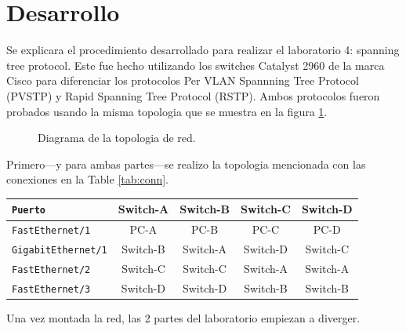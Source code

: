 \section{Desarrollo}

Se explicara el procedimiento desarrollado para realizar el laboratorio 4: spanning
tree protocol. Este fue hecho utilizando los switches Catalyst 2960 de la marca Cisco
para diferenciar los protocolos Per VLAN Spannning Tree Protocol (PVSTP) y Rapid
Spanning Tree Protocol (RSTP). Ambos protocolos fueron probados usando la misma
topologia que se muestra en la figura \ref{fig:topology}.

\begin{figure}
  \center
  
  \caption{Diagrama de la topologia de red.}
  \label{fig:topology}
\end{figure}

Primero---y para ambas partes---se realizo la topologia mencionada con las
conexiones en la Table \ref{tab:conn}.

\begin{center}
  \begin{tabular}{ l c c c c }
    \hline
    \texttt{Puerto}            & Switch-A & Switch-B  & Switch-C  & Switch-D \\
    \hline
    \texttt{FastEthernet/1}    & PC-A     & PC-B      & PC-C      & PC-D     \\
    \texttt{GigabitEthernet/1} & Switch-B & Switch-A  & Switch-D  & Switch-C \\
    \texttt{FastEthernet/2}    & Switch-C & Switch-C  & Switch-A  & Switch-A \\
    \texttt{FastEthernet/3}    & Switch-D & Switch-D  & Switch-B  & Switch-B \\
    \hline
  \end{tabular}
  \label{tab:conn}
\end{center}

Una vez montada la red, las 2 partes del laboratorio empiezan a diverger.





